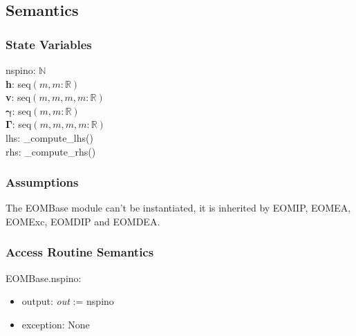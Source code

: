 \documentclass[12pt, titlepage]{article}
\begin{document}
\subsection{Semantics}

\subsubsection{State Variables}
nspino: $\mathbb{N}$\\
\textbf{h}: seq$(m,m:\mathbb{R})$\\
\textbf{v}: seq$(m,m,m,m:\mathbb{R})$\\
$\boldsymbol{\gamma}$: seq$(m,m:\mathbb{R})$\\
$\boldsymbol{\Gamma}$: seq$(m,m,m,m:\mathbb{R})$\\
lhs: \_compute\_lhs()\\
rhs: \_compute\_rhs()

%
%
\subsubsection{Assumptions}

The EOMBase module can't be instantiated, it is inherited by EOMIP, EOMEA, 
EOMExc, EOMDIP and EOMDEA.
%
\subsubsection{Access Routine Semantics}
%
%
\noindent EOMBase.nspino:
\begin{itemize}
	\item output: \textit{out} := nspino
	\item exception: None
\end{itemize}
\end{document}
